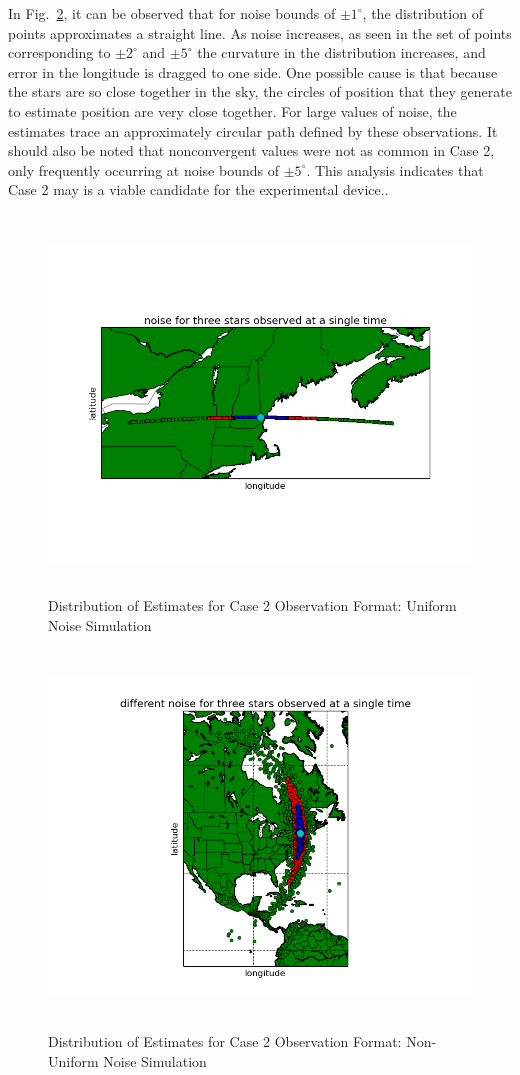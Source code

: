 \documentclass[12pt,a4paper]{book}
\begin{document}
In Fig.~\ref{f:3s1t_case2_noise}, it can be observed that for noise bounds of $\pm 1^{\circ}$, the distribution of points approximates a straight line.  As noise increases, as seen in the set of points corresponding to $\pm 2^{\circ}$ and $\pm 5^{\circ}$ the curvature in the distribution increases, and error in the longitude is dragged to one side. One possible cause is that because the stars are so close together in the sky, the circles of position that they generate to estimate position are very close together.  For large values of noise, the estimates trace an approximately circular path defined by these observations. It should also be noted that nonconvergent values were not as common in Case 2, only frequently occurring at noise bounds of $\pm 5^{\circ}$.  This analysis indicates that Case 2 may is a viable candidate for the experimental device..
\begin{figure}[!htb]
\centering
\includegraphics[height=10cm]{3s1t_single_total_noise.png}
\caption{Distribution of Estimates for Case 2 Observation Format: Uniform Noise Simulation}
\label{f:3s1t_single_total_noise}
\end{figure}

\begin{figure}[!htb]
\centering
\includegraphics[height=10cm]{3s1t_single_case2_noise.png}
\caption{Distribution of Estimates for Case 2 Observation Format: Non-Uniform Noise Simulation}
\label{f:3s1t_case2_noise}
\end{figure}
\FloatBarrier
\end{document}
